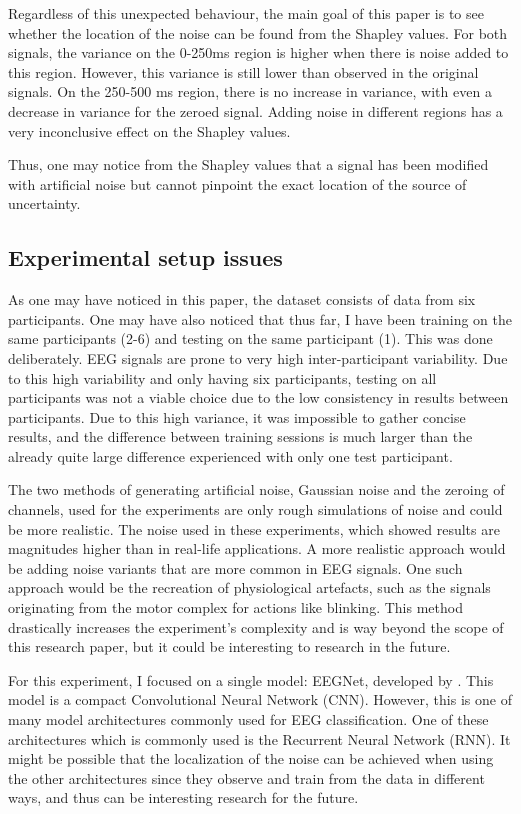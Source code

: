 Regardless of this unexpected behaviour, the main goal of this paper is to see whether the location of the noise can be found from the Shapley values. For both signals, the variance on the 0-250ms region is higher when there is noise added to this region. However, this variance is still lower than observed in the original signals. On the 250-500 ms region, there is no increase in variance, with even a decrease in variance for the zeroed signal. Adding noise in different regions has a very inconclusive effect on the Shapley values. 

Thus, one may notice from the Shapley values that a signal has been modified with artificial noise but cannot pinpoint the exact location of the source of uncertainty.

\subsection{Experimental setup issues}

As one may have noticed in this paper, the dataset consists of data from six participants. One may have also noticed that thus far, I have been training on the same participants (2-6) and testing on the same participant (1). This was done deliberately. EEG signals are prone to very high inter-participant variability. Due to this high variability and only having six participants, testing on all participants was not a viable choice due to the low consistency in results between participants. Due to this high variance, it was impossible to gather concise results, and the difference between training sessions is much larger than the already quite large difference experienced with only one test participant.

The two methods of generating artificial noise, Gaussian noise and the zeroing of channels, used for the experiments are only rough simulations of noise and could be more realistic. The noise used in these experiments, which showed results are magnitudes higher than in real-life applications. A more realistic approach would be adding noise variants that are more common in EEG signals. One such approach would be the recreation of physiological artefacts, such as the signals originating from the motor complex for actions like blinking. This method drastically increases the experiment's complexity and is way beyond the scope of this research paper, but it could be interesting to research in the future.

For this experiment, I focused on a single model: EEGNet, developed by \cite{lawhern2018eegnet}. This model is a compact Convolutional Neural Network (CNN). However, this is one of many model architectures commonly used for EEG classification. One of these architectures which is commonly used is the Recurrent Neural Network (RNN). It might be possible that the localization of the noise can be achieved when using the other architectures since they observe and train from the data in different ways, and thus can be interesting research for the future.
